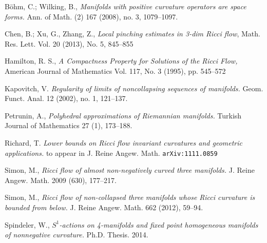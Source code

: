 \documentclass[a4paper,10pt]{amsart}
\begin{document}
\begin{thebibliography}{52}
 B\"ohm, C.; Wilking, B.,
\textit{Manifolds with positive curvature operators are space forms.} Ann. of Math. (2) 167 (2008), no. 3, 1079--1097.

Chen, B.;  Xu, G., Zhang, Z.,
\textit{Local pinching estimates in 3-dim Ricci flow},
Math. Res. Lett. Vol. 20 (2013), No. 5, 845--855

Hamilton, R. S.,
\textit{A Compactness Property for Solutions of the Ricci Flow,}
American Journal of Mathematics
Vol. 117, No. 3 (1995), pp. 545--572

Kapovitch, V.
\textit{Regularity of limits of noncollapsing sequences of manifolds.}
Geom. Funct. Anal. 12 (2002), no. 1, 121--137. 

 Petrunin, A., 
\textit{Polyhedral approximations of Riemannian manifolds.}
Turkish Journal of Mathematics 27 (1), 173--188.

 Richard, T. 
\textit{Lower bounds on Ricci flow invariant curvatures and geometric applications.} to appear in J. Reine Angew. Math.
{\tt arXiv:1111.0859}

Simon, M., 
\textit{Ricci flow of almost non-negatively curved three manifolds.} 
J. Reine Angew. Math. 
2009 (630),
177--217.

Simon, M.,
\textit{Ricci flow of non-collapsed three manifolds whose Ricci curvature is bounded from below.}
J. Reine Angew. Math. 662 (2012), 59--94.


Spindeler, W.,
\textit{$S^1$-actions on 4-manifolds and fixed point
homogeneous manifolds of nonnegative
curvature.}
Ph.D. Thesis. 2014.

\end{thebibliography}
\end{document}
